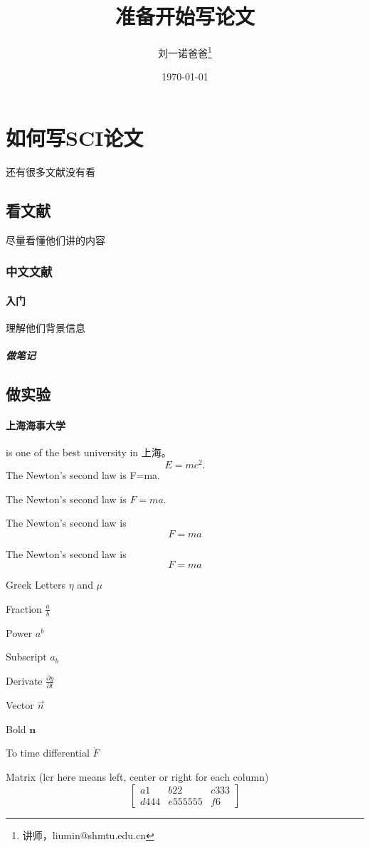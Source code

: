 \documentclass[UTF8]{ctexart}
\title{准备开始写论文}
\author{刘一诺爸爸\thanks{讲师，liumin@shmtu.edu.cn}}
\date{\today}
\begin{document}
\maketitle
\tableofcontents
\section{如何写SCI论文}
还有很多文献没有看
\subsection{看文献}
尽量看懂他们讲的内容
\subsubsection{中文文献}
\paragraph{入门}
理解他们背景信息
\subparagraph{做笔记}
\subsection{做实验}
\paragraph{上海海事大学} is one of the best university in 上海。
\begin{equation}
    E=mc^2.
\end{equation}
The Newton's second law is F=ma.

The Newton's second law is $F=ma$.

The Newton's second law is
$$F=ma$$

The Newton's second law is
\[F=ma\]

Greek Letters $\eta$ and $\mu$

Fraction $\frac{a}{b}$

Power $a^b$

Subscript $a_b$

Derivate $\frac{\partial y}{\partial t} $

Vector $\vec{n}$

Bold $\mathbf{n}$

To time differential $\dot{F}$

Matrix (lcr here means left, center or right for each column)
\[
    \left[
        \begin{array}{lcr}
            a1   & b22     & c333 \\
            d444 & e555555 & f6
        \end{array}
        \right]
\]
\end{document}

